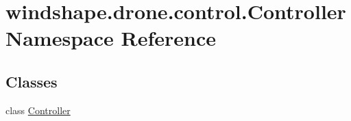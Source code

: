 \hypertarget{namespacewindshape_1_1drone_1_1control_1_1_controller}{}\section{windshape.\+drone.\+control.\+Controller Namespace Reference}
\label{namespacewindshape_1_1drone_1_1control_1_1_controller}
\subsection*{Classes}
\begin{DoxyCompactItemize}
\item 
class \mbox{\hyperlink{classwindshape_1_1drone_1_1control_1_1_controller_1_1_controller}{Controller}}
\end{DoxyCompactItemize}
